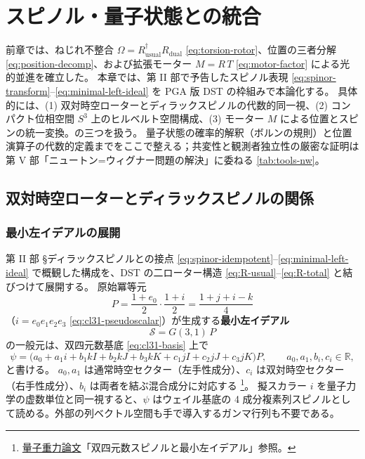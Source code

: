 \documentclass[dvipdfmx,a4paper,oneside]{jsbook}
\numberwithin{equation}{chapter}
\begin{document}
\newpage

\chapter{スピノル・量子状態との統合}

前章では、ねじれ不整合 \(\Omega = R_{\mathrm{usual}}^\dagger R_{\mathrm{dual}}\) \eqref{eq:torsion-rotor}、位置の三者分解 \eqref{eq:position-decomp}、および拡張モーター \(M = R\,T\) \eqref{eq:motor-factor} による光的並進を確立した。
本章では、第 II 部で予告したスピノル表現 \eqref{eq:spinor-transform}–\eqref{eq:minimal-left-ideal} を PGA 版 DST の枠組みで本論化する。
具体的には、(1) 双対時空ローターとディラックスピノルの代数的同一視、(2) コンパクト位相空間 \(S^3\) 上のヒルベルト空間構成、(3) モーター \(M\) による位置とスピンの統一変換。の三つを扱う。
量子状態の確率的解釈（ボルンの規則）と位置演算子の代数的定義までをここで整える；共変性と観測者独立性の厳密な証明は第 V 部「ニュートン=ウィグナー問題の解決」に委ねる \eqref{tab:tools-nw}。

\section{双対時空ローターとディラックスピノルの関係}

\subsection{最小左イデアルの展開}

第 II 部 §ディラックスピノルとの接点 \eqref{eq:spinor-idempotent}–\eqref{eq:minimal-left-ideal} で概観した構成を、DST の二ローター構造 \eqref{eq:R-usual}–\eqref{eq:R-total} と結びつけて展開する。
原始冪等元
\begin{equation}
  P = \frac{1 + e_0}{2}\cdot\frac{1 + i}{2}
  = \frac{1 + j + i - k}{4}
  \label{eq:spinor-idempotent-dst}
\end{equation}
（\(i = e_0 e_1 e_2 e_3\) \eqref{eq:cl31-pseudoscalar}）が生成する\textbf{最小左イデアル}
\begin{equation}
  \mathcal{S} = G(3,1)\,P
  \label{eq:spinor-ideal-dst}
\end{equation}
の一般元は、双四元数基底 \eqref{eq:cl31-basis} 上で
\begin{equation}
  \psi
  = \bigl(
    a_0 + a_1 i
    + b_1 kI + b_2 kJ + b_3 kK
    + c_1 jI + c_2 jJ + c_3 jK
  \bigr) P,
  \qquad a_0,a_1,b_i,c_i \in \mathbb{R},
  \label{eq:spinor-general}
\end{equation}
と書ける。
\(a_0, a_1\) は通常時空セクター（左手性成分）、\(c_i\) は双対時空セクター（右手性成分）、\(b_i\) は両者を結ぶ混合成分に対応する \footnote{\hyperref[sec:sister-manuscripts]{量子重力論文}「双四元数スピノルと最小左イデアル」参照。}。
擬スカラー \(i\) を量子力学の虚数単位と同一視すると、\(\psi\) はウェイル基底の 4 成分複素列スピノルとして読める。外部の列ベクトル空間も手で導入するガンマ行列も不要である。
\end{document}
